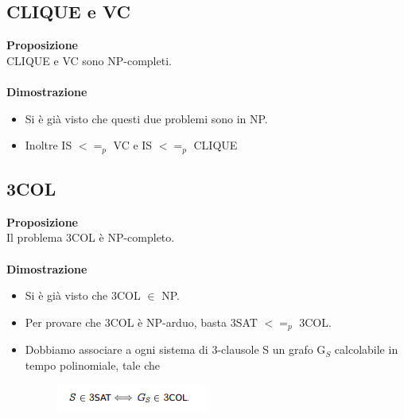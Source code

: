 \subsection{CLIQUE e VC}
\textbf{Proposizione}\\
CLIQUE e VC sono NP-completi.\\\\
\textbf{Dimostrazione}\\
\begin{itemize}
    \item Si è già visto che questi due problemi sono in NP.
    
    \item Inoltre IS $<=_p$ VC e IS $<=_p$ CLIQUE
\end{itemize}
\subsection{3COL}
\textbf{Proposizione}\\
Il problema 3COL è NP-completo.\\\\
\textbf{Dimostrazione}\\
\begin{itemize}
    \item Si è già visto che 3COL $\in$ NP.
    
    \item Per provare che 3COL è NP-arduo, basta 3SAT $<=_p$ 3COL.
    
    \item Dobbiamo associare a ogni sistema di 3-clausole S un grafo  G$_S$ calcolabile in tempo polinomiale, tale che
    
   \begin{figure}[htp]
        \centering
        \includegraphics[scale=0.9]{tesi_stile/img/foto4cap13.png}
    \end{figure}
\end{itemize}
